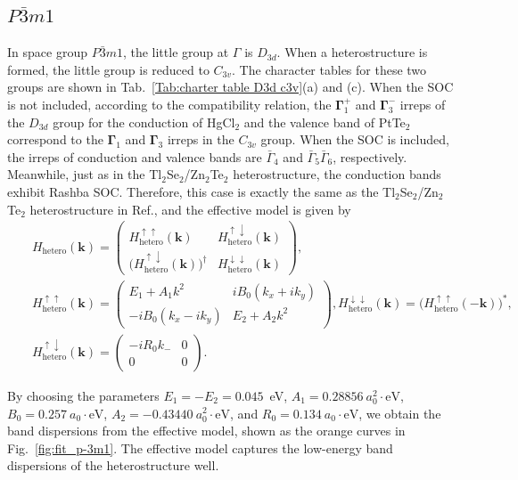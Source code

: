 \documentclass[aps, preprint, prb,]{revtex4-2}
\def\kk{\mathbf{k}}
\begin{document}
\subsection{$P\bar{3}m1$}
In space group $P\bar{3}m1$, the little group at $\Gamma$ is $D_{3d}$. When a heterostructure is formed, the little group is reduced to $C_{3v}$. The character tables for  these two groups are shown in Tab.~\ref{Tab:charter table D3d c3v}(a) and (c). When the SOC is not included, according to the compatibility relation, the $\mathbf{\Gamma}^+_1$ and $\mathbf{\Gamma}^-_3$ irreps of the $D_{3d}$ group for the conduction of HgCl$_2$ and the valence band of PtTe$_2$ correspond to the $\mathbf{\Gamma}_1$ and $\mathbf{\Gamma}_3$ irreps in the $C_{3v}$ group. When the SOC is included,  the irreps of conduction and valence bands are $\bar{\Gamma}_4$ and $\bar{\Gamma}_5\bar{\Gamma}_6$, respectively. Meanwhile, just as in the Tl$_2$Se$_2$/Zn$_2$Te$_2$ heterostructure, the conduction bands exhibit Rashba SOC.  Therefore, this case is exactly the same as the Tl$_2$Se$_2$/Zn$_2$Te$_2$ heterostructure in Ref.\cite{Liu2025IdealTHF}, and the effective model is given by
\begin{eqnarray}
&&H_{\mathrm{hetero}}(\kk)=
\begin{pmatrix}
H^{\uparrow\uparrow}_{\mathrm{hetero}}(\kk) & H^{\uparrow\downarrow}_{\mathrm{hetero}}(\kk) \\
\bigl(H^{\uparrow\downarrow}_{\mathrm{hetero}}(\kk)\bigr)^\dagger & H^{\downarrow\downarrow}_{\mathrm{hetero}}(\kk)
\end{pmatrix},\nonumber\\
&&H^{\uparrow\uparrow}_{\mathrm{hetero}}(\kk)=
\begin{pmatrix}
E_1 + A_1 k^2 & i B_0 (k_x + i k_y) \nonumber \\
- i B_0 (k_x - i k_y) & E_2 + A_2 k^2
\end{pmatrix}, H^{\downarrow\downarrow}_{\mathrm{hetero}}(\kk)=
\bigl(H^{\uparrow\uparrow}_{\mathrm{hetero}}(-\kk)\bigr)^*, \\
&&H^{\uparrow\downarrow}_{\mathrm{hetero}}(\kk)=
\begin{pmatrix}
- i R_0 k_- & 0 \\
0 & 0
\end{pmatrix}. \label{Eq;Rashba}
\end{eqnarray}

 By choosing the parameters $E_1=-E_2=0.045$~eV, $A_1=0.28856~a_0^2\!\cdot\!\mathrm{eV}$, $B_0=0.257~a_0\!\cdot\!\mathrm{eV}$, $A_2=-0.43440~a_0^2\!\cdot\!\mathrm{eV}$, and $R_0=0.134~a_0\!\cdot\!\mathrm{eV}$, we obtain the band dispersions from the effective model, shown as the orange curves in Fig.~\ref{fig:fit_p-3m1}. The effective model captures the low-energy band dispersions of the heterostructure well. 
\end{document}
